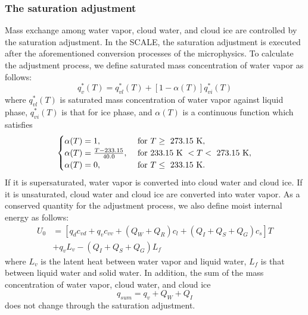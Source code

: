 \subsubsection{The saturation adjustment}
Mass exchange among water vapor, cloud water, and cloud ice are controlled by the saturation adjustment. In the SCALE, the saturation adjustment is executed after the aforementioned conversion processes of the microphysics. To calculate the adjustment process, we define saturated mass concentration of water vapor as follows:
\begin{equation}
  q^{*}_{v}(T) = q^{*}_{vl}(T)+[1-\alpha (T)]q^{*}_{vi}(T)\label{eq:satuqv}
\end{equation}
where $q^{*}_{vl}(T)$ is saturated mass concentration of water vapor against liquid phase, $q^{*}_{vi}(T)$ is that for ice phase, and $\alpha (T)$ is a continuous function which satisfies
\begin{align}
\begin{cases}
  \alpha (T) = 1, & {\rm \ for\ } T \geq {\rm \ 273.15 \ K} ,\\
  \alpha (T) = \frac{T-233.15}{40.0}, & {\rm \ for\ 233.15\ K \ } < T < {\rm \ 273.15 \ K},\\
  \alpha (T) = 0, & {\rm \ for\ } T \leq {\rm \ 233.15 \ K}.
\end{cases}
\end{align}
If it is supersaturated, water vapor is converted into cloud water and cloud ice. If it is unsaturated, cloud water and cloud ice are converted into water vapor. As a conserved quantity for the adjustment process, we also define moist internal energy as follows:
\begin{align}
  U_{0}&=[q_{d}c_{vd}+q_{v}c_{vv}+(Q_{W}+Q_{R})c_{l}+(Q_{I}+Q_{S}+Q_{G})c_{s}]T \nonumber \\ 
  &+q_{v}L_{v}-(Q_{I}+Q_{S}+Q_{G})L_{f}
\end{align}
where $L_{v}$ is the latent heat between water vapor and liquid water, $L_{f}$ is that between liquid water and solid water. In addition, the sum of the mass concentration of water vapor, cloud water, and cloud ice
\begin{equation}
  q_{sum}=q_{v}+Q_{W}+Q_{I}
\end{equation}
does not change through the saturation adjustment.

